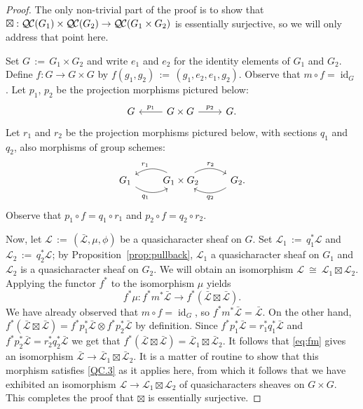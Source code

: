 \documentclass{amsart}
\theoremstyle{plain}
\theoremstyle{definition}
\theoremstyle{remark}
\DeclareMathOperator{\id}{id}
\newcommand{\ceq}{{\, :=\, }}
\newcommand{\iso}{{\ \cong\ }}
\newcommand{\qcs}[1]{{\mathcal{#1}}}
\newcommand{\gqcs}[1]{{\mathcal{\bar #1}}}
\newcommand{\QC}{{\mathcal{Q\hskip-0.8pt C}}}
\begin{document}
\begin{proof}
The only non-trivial part of the proof is to show that $\boxtimes : \QC(G_1)\times \QC(G_2) \to \QC(G_1\times G_2)$
is essentially surjective, so we will only address that point here.

Set $G \ceq G_1\times G_2$
and write $e_1$ and $e_2$ for the identity elements of $G_1$ and $G_2$.
Define $f : G\to G\times G$ by $f(g_1,g_2) \ceq (g_1,e_2,e_1,g_2)$.
Observe that $m\circ f = \id_G$.
Let $p_1$, $p_2$ be the projection morphisms pictured below:
\[
\begin{tikzcd}
G & \arrow[swap]{l}{p_1} G\times G \arrow{r}{p_2} & G.
\end{tikzcd}
\]
Let $r_1$ and $r_2$ be the projection morphisms pictured below,
with sections $q_1$ and $q_2$, also morphisms of group schemes:
\[
\begin{tikzcd}
G_1  \arrow[swap, bend right]{r}{q_1} &
\arrow[swap, bend right]{l}{r_1} G_1\times G_2 \arrow[bend left]{r}{r_2} &
\arrow[bend left]{l}{q_2} G_2.
\end{tikzcd}
\]
Observe that $p_1\circ f = q_1 \circ r_1$ and $p_2 \circ f = q_2\circ r_2$.

Now, let $\qcs{L} \ceq (\gqcs{L},\mu,\phi)$ be a quasicharacter sheaf on $G$.
Set $\qcs{L}_1 \ceq q_1^* \qcs{L}$ and $\qcs{L}_2 \ceq q_2^* \qcs{L}$;
by Proposition~\ref{prop:pullback}, $\qcs{L}_1$ a quasicharacter sheaf on $G_1$
and $\qcs{L}_2$ is a quasicharacter sheaf on $G_2$.
We will obtain an isomorphism $\qcs{L} \iso  \qcs{L}_1\boxtimes \qcs{L}_2$.
Applying the functor $f^*$ to the isomorphism $\mu$ yields
\begin{equation}\label{eq:fm}
f^*\mu : f^* m^* \gqcs{L} \to f^*(\gqcs{L}\boxtimes \gqcs{L}) .
\end{equation}
We have already observed that $m\circ f = \id_G$, so $f^* m^* \gqcs{L} = \gqcs{L}$.
On the other hand, $f^*(\gqcs{L}\boxtimes \gqcs{L}) = f^*p_1^*\gqcs{L}\otimes f^* p_2^*\gqcs{L}$
by definition.  Since $f^*p_1^*\gqcs{L} = r_1^* q_1^* \gqcs{L}$ and $f^*p_2^*\gqcs{L} = r_2^* q_2^* \gqcs{L}$
we get that $f^*(\gqcs{L}\boxtimes \gqcs{L}) = \gqcs{L}_1\boxtimes \gqcs{L}_2$.
It follows that \eqref{eq:fm} gives an isomorphism $\gqcs{L} \to  \gqcs{L}_1\boxtimes \gqcs{L}_2$.
It is a matter of routine to show that this morphism satisfies
\ref{QC.3} as it applies here,
from which it follows that we have exhibited an isomorphism
$\qcs{L} \to \qcs{L}_1\boxtimes \qcs{L}_2$ of quasicharacters sheaves on $G\times G$.
This completes the proof that $\boxtimes$ is essentially surjective.
\end{proof}
\end{document}
